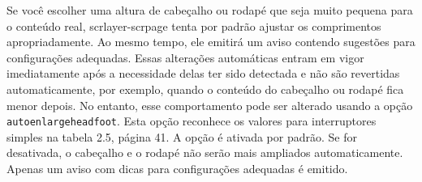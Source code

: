 Se você escolher uma altura de cabeçalho ou rodapé que seja muito pequena para o conteúdo real, scrlayer-scrpage tenta por padrão ajustar os comprimentos apropriadamente. Ao mesmo tempo, ele emitirá um aviso contendo sugestões para configurações adequadas. Essas alterações automáticas entram em vigor imediatamente após a necessidade delas ter sido detectada e não são revertidas automaticamente, por exemplo, quando o conteúdo do cabeçalho ou rodapé fica menor depois. No entanto, esse comportamento pode ser alterado usando a opção \texttt{auto\-en\-lar\-ge\-head\-foot}. Esta opção reconhece os valores para interruptores simples na tabela 2.5, página 41. A opção é ativada por padrão. Se for desativada, o cabeçalho e o rodapé não serão mais ampliados automaticamente. Apenas um aviso com dicas para configurações adequadas é emitido.


